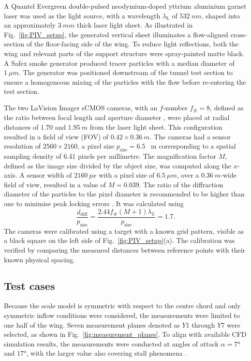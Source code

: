 \documentclass[wes, manuscript]{copernicus}
\begin{document}
A Quantel Evergreen double-pulsed neodymium-doped yttrium aluminium garnet laser was used as the light source, with a wavelength $\lambda_{\textrm{L}}$ of $532~\unit{nm}$, shaped into an approximately $3~\unit{mm}$ thick laser light sheet. As illustrated in Fig.~\ref{fig:PIV_setup}, the generated vertical sheet illuminates a flow-aligned cross-section of the floor-facing side of the wing. To reduce light reflections, both the wing and relevant parts of the support structure were spray-painted matte black. A Safex smoke generator produced tracer particles with a median diameter of $1~\unit{\mu m}$. The generator was positioned downstream of the tunnel test section to ensure a homogeneous mixing of the particles with the flow before re-entering the test section.

The two LaVision Imager sCMOS cameras, with an $f$-number $f_{\#} = 8$, defined as the ratio between focal length and aperture diameter \citep{Raffel2018},
were placed at radial distances of $1.70$ and $1.95~\unit{m}$ from the laser light sheet. This configuration resulted in a field of view (FOV) of $0.42 \times 0.36~\unit{m}$. The cameras had a sensor resolution of $2560 \times 2160$, a pixel size $p_{\textrm{size}} = 6.5$ \unit{\mu m} corresponding to a spatial sampling density of 6.41 pixels per millimetre. The magnification factor $M$, defined as the image size divided by the object size, was computed along the $x$-axis.
A sensor width of $2160~\unit{px}$ with a pixel size of $6.5~\unit{\mu m}$, over a $0.36~\unit{m}$-wide field of view, resulted in a value of $M=0.039$. The ratio of the diffraction diameter of the particles to the pixel diameter is recommended to be higher than one to minimise peak locking errors \citep{Raffel2018,Bensason2025}. It was calculated using
\begin{equation}
    \frac{d_{\textrm{diff}}}{p_{\textrm{size}}} = \frac{2.44 f_{\#} (M + 1) \lambda_L}{p_{\textrm{size}}} = 1.7.
\end{equation}
The cameras were calibrated using a target with a known grid pattern, visible as a black square on the left side of Fig.~\ref{fig:PIV_setup}(a). The calibration was verified by comparing the measured distances between reference points with their known physical spacing.
%
\subsection{Test cases}
%
Because the scale model is symmetric with respect to the centre chord and only symmetric inflow conditions were considered, the measurements were limited to one half of the wing. Seven measurement planes denoted as $Y1$ through $Y7$ were selected, as shown in Fig.~\ref{fig:measurement_planes}. To align with available CFD simulation results, the measurements were conducted at angles of attack $\alpha = 7\unit{\degree}$ and $17\unit{\degree}$, with the larger value also covering stall phenomena \citep{Poland2026b}.
\end{document}
